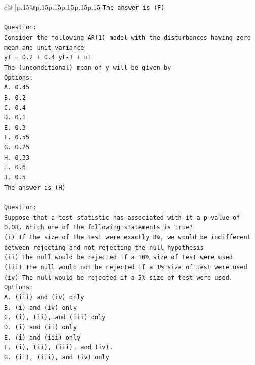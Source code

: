 \documentclass{article}
\begin{document}
{\begin{supertabular}{c@{$\;$}|p{.15\linewidth}@{}p{.15\linewidth}p{.15\linewidth}p{.15\linewidth}p{.15\linewidth}p{.15\linewidth}}
{{{\texttt{The answer is (F)} \\
\\ 
\texttt{Question:} \\
\texttt{Consider the following AR(1) model with the disturbances having zero mean and unit variance} \\
\texttt{yt = 0.2 + 0.4 yt{-}1 + ut} \\
\texttt{The (unconditional) mean of y will be given by} \\
\texttt{Options:} \\
\texttt{A. 0.45} \\
\texttt{B. 0.2} \\
\texttt{C. 0.4} \\
\texttt{D. 0.1} \\
\texttt{E. 0.3} \\
\texttt{F. 0.55} \\
\texttt{G. 0.25} \\
\texttt{H. 0.33} \\
\texttt{I. 0.6} \\
\texttt{J. 0.5} \\
\texttt{The answer is (H)} \\
\\ 
\texttt{Question:} \\
\texttt{Suppose that a test statistic has associated with it a p{-}value of 0.08. Which one of the following statements is true?} \\
\texttt{(i) If the size of the test were exactly 8\%, we would be indifferent between rejecting and not rejecting the null hypothesis} \\
\texttt{(ii) The null would be rejected if a 10\% size of test were used} \\
\texttt{(iii) The null would not be rejected if a 1\% size of test were used} \\
\texttt{(iv) The null would be rejected if a 5\% size of test were used.} \\
\texttt{Options:} \\
\texttt{A. (iii) and (iv) only} \\
\texttt{B. (i) and (iv) only} \\
\texttt{C. (i), (ii), and (iii) only} \\
\texttt{D. (i) and (ii) only} \\
\texttt{E. (i) and (iii) only} \\
\texttt{F. (i), (ii), (iii), and (iv).} \\
\texttt{G. (ii), (iii), and (iv) only} \\
}}}
\end{supertabular}}
\end{document}

